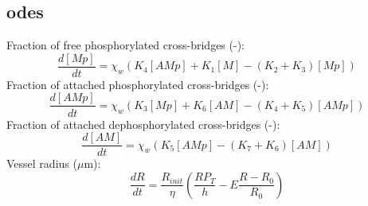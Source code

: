 \documentclass[11pt]{elsarticle}
\newcommand{\um}{$\mu$m\xspace}
\begin{document}
\subsection{\Glspl{ode}}
Fraction of free phosphorylated cross-bridges (-):
\begin{equation} \label{eq:dMpdt}
\frac{d[Mp]}{d t} =  \chi_w 
\left( K_{4}[AMp] +K_{1} [M] - ( K_{2} + K_{3} ) [Mp]
\right) 
\end{equation}
%
Fraction of attached phosphorylated cross-bridges (-):
\begin{equation} \label{eq:dAMpdt}
\frac{d[AMp]}{d t} = \chi_w 
\left( K_{3} [Mp] + K_{6} [AM] - ( K_{4} + K_{5} )[AMp] \right)
\end{equation} 
%
Fraction of attached dephosphorylated cross-bridges (-):
\begin{equation} \label{eq:dAMdt}
\frac{d[AM]}{d t} =  \chi_w 
\left(  K_{5} [AMp]-(K_{7}+K_{6})[AM] \right)
\end{equation}
%
Vessel radius (\um):
\begin{equation} \label{eq:dRdt2e}
\frac{dR}{dt}= \frac{R_{init}}{\eta}\left(   \frac{ R P_{T}}{h}  - E \frac{R - R_0}{R_0} \right)
\end{equation}
%
\end{document}
